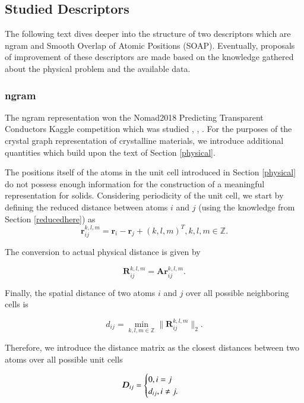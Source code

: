 \documentclass[11pt,oneside,czech,american]{book} %
\theoremstyle{plain}
\theoremstyle{definition}
\begin{document}
\subsection{Studied Descriptors}
The following text dives deeper into the structure of two descriptors which are ngram and Smooth Overlap of Atomic Positions (SOAP). Eventually, proposals of improvement of these descriptors are made based on the knowledge gathered about the physical problem and the available data.
\subsubsection{ngram}
The  ngram representation won the Nomad2018 Predicting Transparent Conductors Kaggle competition which was studied \parencite{sutton18}, \parencite{sutton19}, \parencite{kaggle_web}. For the purposes of the crystal graph representation of crystalline materials, we introduce additional quantities which build upon the text of Section \ref{physical}.

The positions itself of the atoms in the unit cell introduced in Section \ref{physical} do not possess enough information for the construction of a meaningful representation for solids. Considering periodicity of the unit cell, we start by defining the reduced distance between atoms $i$ and $j$ (using the knowledge from Section \ref{reducedhere}) as
\begin{equation}
	\bm{r}^{k,l,m}_{ij} = \bm{r}_i - \bm{r}_j + (k, l, m)^T,    k,l,m \in \mathbb{Z}.
\end{equation}

The conversion to actual physical distance is given by

\begin{equation}
	\bm{R}^{k,l,m}_{ij} = \bm{A} \bm{r}^{k,l,m}_{ij}.
\end{equation}

Finally, the spatial distance of two atoms $i$ and $j$ over all possible neighboring cells is

\begin{equation}
	d_{ij} = \min_{k,l,m \in \mathbb{Z}}{\|\bm{R}^{k,l,m}_{ij}\|_2}.
\end{equation}

Therefore, we introduce the distance matrix as the closest distances between two atoms over all possible unit cells

\begin{equation}
	\bm{D}_{ij} = 
	\begin{cases}
		0,\space i = j \\
		d_{ij}, \space i \neq j.
	\end{cases}
\end{equation}
\end{document}
